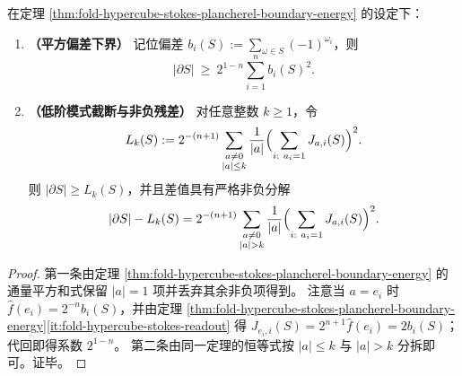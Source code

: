 \begin{corollary}[平方偏差下界与低阶模式截断]\label{cor:fold-hypercube-stokes-plancherel-truncation}
在定理 \ref{thm:fold-hypercube-stokes-plancherel-boundary-energy} 的设定下：
\begin{enumerate}
  \item \textbf{（平方偏差下界）} 记位偏差 \(b_i(S):=\sum_{\omega\in S}(-1)^{\omega_i}\)，则
  \[
  |\partial S|\ \ge\ 2^{1-n}\sum_{i=1}^n b_i(S)^2.
  \]
  \item \textbf{（低阶模式截断与非负残差）} 对任意整数 \(k\ge 1\)，令
  \[
  L_k(S):=2^{-(n+1)}\sum_{\substack{a\neq 0\\ |a|\le k}}\frac{1}{|a|}
  \Bigl(\sum_{i:\ a_i=1}J_{a,i}(S)\Bigr)^2.
  \]
  则 \(|\partial S|\ge L_k(S)\)，并且差值具有严格非负分解
  \[
  |\partial S|-L_k(S)
  =
  2^{-(n+1)}\sum_{\substack{a\neq 0\\ |a|> k}}\frac{1}{|a|}
  \Bigl(\sum_{i:\ a_i=1}J_{a,i}(S)\Bigr)^2.
  \]
\end{enumerate}
\end{corollary}
\begin{proof}
第一条由定理 \ref{thm:fold-hypercube-stokes-plancherel-boundary-energy} 的通量平方和式保留 \(|a|=1\) 项并丢弃其余非负项得到。
注意当 \(a=e_i\) 时 \(\widehat f(e_i)=2^{-n}b_i(S)\)，并由定理 \ref{thm:fold-hypercube-stokes-plancherel-boundary-energy}\ref{it:fold-hypercube-stokes-readout} 得
\(
J_{e_i,i}(S)=2^{n+1}\widehat f(e_i)=2b_i(S)
\)；
代回即得系数 \(2^{1-n}\)。
第二条由同一定理的恒等式按 \(|a|\le k\) 与 \(|a|>k\) 分拆即可。证毕。
\end{proof}

\endinput
